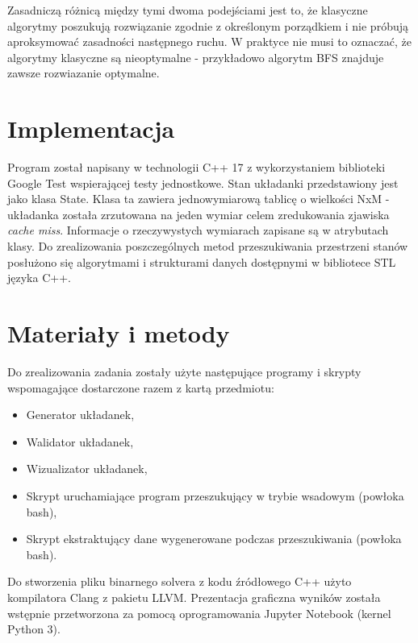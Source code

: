 \documentclass{classrep}
\begin{document}
Zasadniczą różnicą między tymi dwoma podejściami jest to, że klasyczne
algorytmy poszukują rozwiązanie zgodnie z określonym porządkiem i nie
próbują aproksymować zasadności następnego ruchu. W praktyce nie musi to
oznaczać, że algorytmy klasyczne są nieoptymalne - przykładowo algorytm
BFS znajduje zawsze rozwiazanie optymalne.

\section{Implementacja}

Program został napisany w technologii C++ 17 z wykorzystaniem biblioteki
Google Test wspierającej testy jednostkowe. Stan układanki przedstawiony
jest jako klasa State. Klasa ta zawiera jednowymiarową tablicę o
wielkości NxM - układanka została zrzutowana na jeden wymiar celem
zredukowania zjawiska \emph{cache miss}. Informacje o rzeczywystych
wymiarach zapisane są w atrybutach klasy. Do zrealizowania
poszczególnych metod przeszukiwania przestrzeni stanów posłużono się
algorytmami i strukturami danych dostępnymi w bibliotece STL języka C++.

\section{Materiały i metody}
Do zrealizowania zadania zostały użyte następujące programy i skrypty wspomagające dostarczone razem z kartą
przedmiotu:
 \begin{itemize}
   \item
   Generator układanek,
   \item
   Walidator układanek,
   \item
   Wizualizator układanek,
   \item
   Skrypt uruchamiające program przeszukujący w trybie wsadowym (powłoka bash),
   \item
   Skrypt ekstraktujący dane wygenerowane podczas przeszukiwania (powłoka bash).
\end{itemize}
Do stworzenia pliku binarnego solvera z kodu źródłowego C++ użyto kompilatora Clang z pakietu LLVM.
Prezentacja graficzna wyników została wstępnie przetworzona za pomocą oprogramowania Jupyter Notebook (kernel
Python 3).
\end{document}
